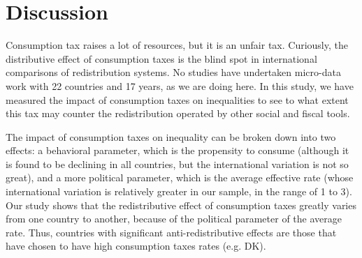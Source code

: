\documentclass[12pt]{article}
\begin{document}


%
%
%


\section{Discussion}

Consumption tax raises a lot of resources, but it is an unfair tax. Curiously, the distributive effect of consumption taxes is the blind spot in international comparisons of redistribution systems. No studies have undertaken micro-data work with 22 countries and 17 years, as we are doing here. In this study, we have measured the impact of consumption taxes on inequalities to see to what extent this tax may counter the redistribution operated by other social and fiscal tools. 

The impact of consumption taxes on inequality can be broken down into two effects: a behavioral parameter, which is the propensity to consume (although it is found to be declining in all countries, but the international variation is not so great), and a more political parameter, which is the average effective rate (whose international variation is relatively greater in our sample, in the range of 1 to 3). Our study shows that the redistributive effect of consumption taxes greatly varies from one country to another, because of the political parameter of the average rate. Thus, countries with significant anti-redistributive effects are those that have chosen to have high consumption taxes rates (e.g. DK). 
\end{document}
